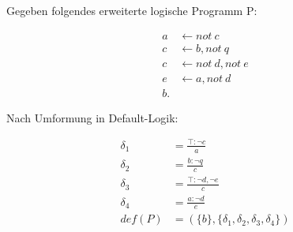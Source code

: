 Gegeben folgendes erweiterte logische Programm P:

\begin{align*}
a &\leftarrow not\ c\\
c &\leftarrow b, not\ q\\
c &\leftarrow not\ d, not\ e\\
e &\leftarrow a, not\ d\\
b.
\end{align*}

Nach Umformung in Default-Logik:

\begin{align*}
\delta_1 &= \frac{\top:\neg{c}}{a}\\
\delta_2 &= \frac{b:\neg{q}}{c}\\
\delta_3 &= \frac{\top:\neg{d}, \neg{e}}{c}\\
\delta_4 &= \frac{a:\neg{d}}{e}\\
def(P) &= (\{b\},\{\delta_1,\delta_2,\delta_3,\delta_4\})
\end{align*}